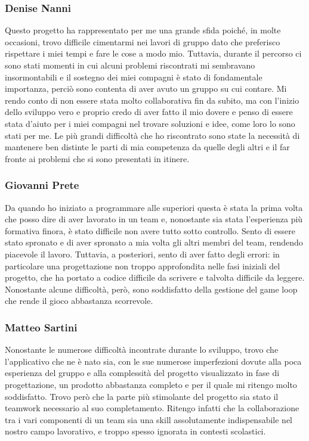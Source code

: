 \documentclass{article}
\begin{document}
\subsubsection{Denise Nanni}
Questo progetto ha rappresentato per me una grande sfida poiché, in molte occasioni, trovo difficile cimentarmi nei lavori di gruppo dato che preferisco rispettare i miei tempi e fare le cose a modo mio. Tuttavia, durante il percorso ci sono stati momenti in cui alcuni problemi riscontrati mi sembravano insormontabili e il sostegno dei miei compagni è stato di fondamentale importanza, perciò sono contenta di aver avuto un gruppo su cui contare.
Mi rendo conto di non essere stata molto collaborativa fin da subito, ma con l'inizio dello sviluppo vero e proprio credo di aver fatto il mio dovere e penso di essere stata d'aiuto per i miei compagni nel trovare soluzioni e idee, come loro lo sono stati per me.
Le più grandi difficoltà che ho riscontrato sono state la necessità di mantenere ben distinte le parti di mia competenza da quelle degli altri e il far fronte ai problemi che si sono presentati in itinere.\\
\subsubsection{Giovanni Prete}
Da quando ho iniziato a programmare alle superiori questa è stata la prima volta che posso dire di aver lavorato in un team e, nonostante sia stata l'esperienza più formativa finora, è stato difficile non avere tutto sotto controllo. Sento di essere stato spronato e di aver spronato a mia volta gli altri membri del team, rendendo piacevole il lavoro. Tuttavia, a posteriori, sento di aver fatto degli errori: in particolare una progettazione non troppo approfondita nelle fasi iniziali del progetto, che ha portato a codice difficile da scrivere e talvolta difficile da leggere. Nonostante alcune difficoltà, però, sono soddisfatto della gestione del game loop che rende il gioco abbastanza scorrevole.\\
\subsubsection{Matteo Sartini}
Nonostante le numerose difficoltà incontrate durante lo sviluppo, trovo che l’applicativo che ne è nato sia, con le sue numerose imperfezioni dovute alla poca esperienza del gruppo e alla complessità del progetto visualizzato in fase di progettazione, un prodotto abbastanza completo e per il quale mi ritengo molto soddisfatto.
Trovo però che la parte più stimolante del progetto sia stato il teamwork necessario al suo completamento. Ritengo infatti che la collaborazione tra i vari componenti di un team sia una skill assolutamente indispensabile nel nostro campo lavorativo, e troppo spesso ignorata in contesti scolastici.\\
\end{document}
